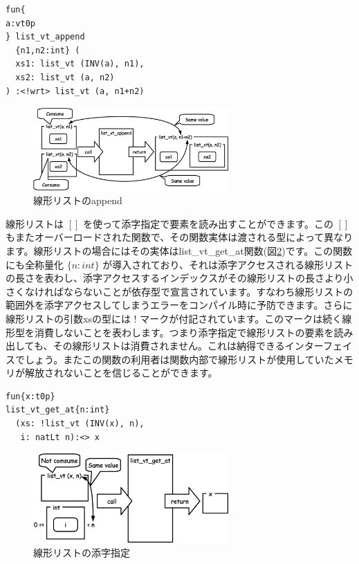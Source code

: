 \documentclass{ipsjprosym}
\begin{document}
\vspace{3mm}
\begin{verbatim}
fun{
a:vt0p
} list_vt_append
  {n1,n2:int} (
  xs1: list_vt (INV(a), n1),
  xs2: list_vt (a, n2)
) :<!wrt> list_vt (a, n1+n2)
\end{verbatim}
\vspace{3mm}

\begin{figure}[h]
\centering
\includegraphics[width=75mm]{draw/list_vt_append.eps}
\caption{線形リストのappend}
\label{fig:list_vt_append}
\end{figure}

線形リストは $[]$ を使って添字指定で要素を読み出すことができます。この $[]$ もまたオーバーロードされた関数で、その関数実体は渡される型によって異なります。線形リストの場合にはその実体はlist\_vt\_get\_at関数(図\ref{fig:list_vt_get_at})です。この関数にも全称量化 $\{n:int\}$ が導入されており、それは添字アクセスされる線形リストの長さを表わし、添字アクセスするインデックスがその線形リストの長さより小さくなければならないことが依存型で宣言されています。すなわち線形リストの範囲外を添字アクセスしてしまうエラーをコンパイル時に予防できます。さらに線形リストの引数xsの型には $!$ マークが付記されています。このマークは続く線形型を消費しないことを表わします。つまり添字指定で線形リストの要素を読み出しても、その線形リストは消費されません。これは納得できるインターフェイスでしょう。またこの関数の利用者は関数内部で線形リストが使用していたメモリが解放されないことを信じることができます。

\vspace{3mm}
\begin{verbatim}
fun{x:t0p}
list_vt_get_at{n:int}
  (xs: !list_vt (INV(x), n),
   i: natLt n):<> x
\end{verbatim}
\vspace{3mm}

\begin{figure}[h]
\centering
\includegraphics[width=75mm]{draw/list_vt_get_at.eps}
\caption{線形リストの添字指定}
\label{fig:list_vt_get_at}
\end{figure}
\end{document}
